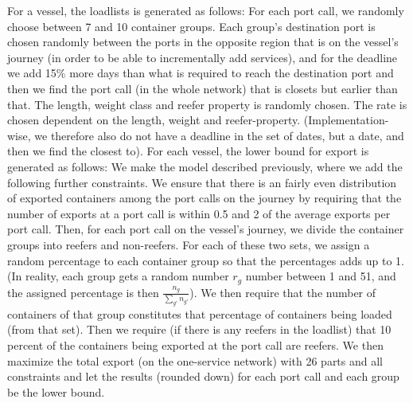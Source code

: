 For a vessel, the loadlists is generated as follows: For each port call, we randomly choose between 7 and 10 container groups. Each group's destination port is chosen randomly between the ports in the opposite region that is on the vessel's journey (in order to be able to incrementally add services), and for the deadline we add 15\% more days than what is required to reach the destination port and then we find the port call (in the whole network) that is closets but earlier than that. The length, weight class and reefer property is randomly chosen. The rate is chosen dependent on the length, weight and reefer-property. (Implementation-wise, we therefore also do not have a deadline in the set of dates, but a date, and then we find the closest to).
For each vessel, the lower bound for export is generated as follows: We make the model described previously, where we add the following further constraints. We ensure that there is an fairly even distribution of exported containers among the port calls on the journey by requiring that the number of exports at a port call is within 0.5 and 2 of the average exports per port call. Then, for each port call on the vessel's journey, we divide the container groups into reefers and non-reefers. For each of these two sets, we assign a random percentage to each container group so that the percentages adds up to 1. (In reality, each group gets a random number $r_g$ number between 1 and 51, and the assigned percentage is then $\frac{n_g}{\sum_{g'}n_{g'}}$). We then require that the number of containers of that group constitutes that percentage of containers being loaded (from that set). Then we require (if there is any reefers in the loadlist) that 10 percent of the containers being exported at the port call are reefers. We then maximize the total export (on the one-service network) with 26 parts and all constraints and let the results (rounded down) for each port call and each group be the lower bound.   

 

